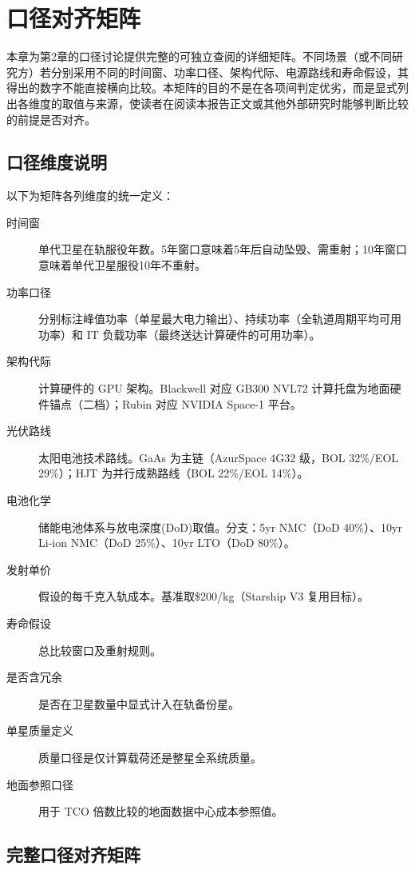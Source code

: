 
\section{口径对齐矩阵}

本章为第2章的口径讨论提供完整的可独立查阅的详细矩阵。不同场景（或不同研究方）若分别采用不同的时间窗、功率口径、架构代际、电源路线和寿命假设，其得出的数字不能直接横向比较。本矩阵的目的不是在各项间判定优劣，而是显式列出各维度的取值与来源，使读者在阅读本报告正文或其他外部研究时能够判断比较的前提是否对齐。

\subsection{口径维度说明}

以下为矩阵各列维度的统一定义：

\begin{description}
  \item[时间窗] 单代卫星在轨服役年数。5年窗口意味着5年后自动坠毁、需重射；10年窗口意味着单代卫星服役10年不重射。
  \item[功率口径] 分别标注峰值功率（单星最大电力输出）、持续功率（全轨道周期平均可用功率）和 IT 负载功率（最终送达计算硬件的可用功率）。
  \item[架构代际] 计算硬件的 GPU 架构。Blackwell 对应 GB300 NVL72 计算托盘为地面硬件锚点（二档）；Rubin 对应 NVIDIA Space-1 平台。
  \item[光伏路线] 太阳电池技术路线。GaAs 为主链（AzurSpace 4G32 级，BOL 32\%/EOL 29\%）；HJT 为并行成熟路线（BOL 22\%/EOL 14\%）。
  \item[电池化学] 储能电池体系与放电深度(DoD)取值。分支：5yr NMC（DoD 40\%）、10yr Li-ion NMC（DoD 25\%）、10yr LTO（DoD 80\%）。
  \item[发射单价] 假设的每千克入轨成本。基准取\$200/kg（Starship V3 复用目标）。
  \item[寿命假设] 总比较窗口及重射规则。
  \item[是否含冗余] 是否在卫星数量中显式计入在轨备份星。
  \item[单星质量定义] 质量口径是仅计算载荷还是整星全系统质量。
  \item[地面参照口径] 用于 TCO 倍数比较的地面数据中心成本参照值。
\end{description}

\subsection{完整口径对齐矩阵}

